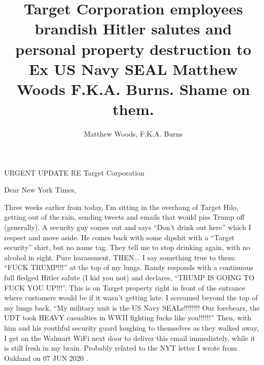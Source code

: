 \documentclass[a4paper]{arthur-letter}
\title{Target Corporation employees brandish Hitler salutes and personal property destruction to Ex US Navy SEAL Matthew Woods F.K.A. Burns. Shame on them.}
\author{Matthew Woods, F.K.A. Burns}
\begin{document}
    \makeprofile %
    
    \address{Matthew Woods,\\PO Box 376\\Mountain View, CA, 94042}

    \begin{letter}

            \subject{TLDR: I'm a former Navy SEAL, smeared by Dianna Cowern (AKA Physics Girl) via Alphabet Inc while working as a Google employee. From 2015-2020, I have experienced severe police misconduct first hand. This is across five counties: San Diego, Orange, Santa Clara, Oahu and Hawaii. I think they may have ties to THE Nazis, since my entire immediate family (Donald Burns, Anne Burns and Susan Burns) are Nazis... the type that agree with Adolf Hitler and Eichmann of WWII. They lied to me about this since I was born.}
            
            URGENT UPDATE RE Target Corporation
            
            \opening{Dear New York Times,}
            
            Three weeks earlier from today, I’m sitting in the overhang of Target Hilo, getting out of the rain, sending tweets and emails that would piss Trump off (generally). A security guy comes out and says “Don’t drink out here” which I respect and move aside. He comes back with some dipshit with a “Target security” shirt, but no name tag. They tell me to stop drinking again, with no alcohol in sight. Pure harassment. THEN... I say something true to them: “FUCK TRUMP!!!” at the top of my lungs. Randy responds with a continuous full fledged Hitler salute (I kid you not) and declares, “TRUMP IS GOING TO FUCK YOU UP!!!”. This is on Target property right in front of the entrance where customers would be if it wasn’t getting late. I screamed beyond the top of my lungs back, “My military unit is the US Navy SEALs!!!!!!!! Our forebears, the UDT took HEAVY casualties in WWII fighting fucks like you!!!!!!” Then, with him and his youthful security guard laughing to themselves as they walked away, I get on the Walmart WiFi next door to deliver this email immediately, while it is still fresh in my brain. Probably related to the NYT letter I wrote from Oakland on 07 JUN 2020 \cite{alphabetinc} \cite{bigbangtheoryhouse5058pendleton}.
            

\end{letter}
\end{document}
